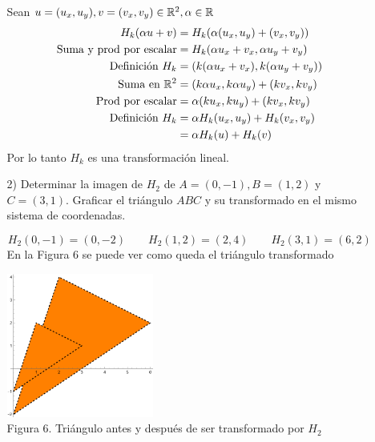 \begin{enumerate}
\begin{enumerate}
\begin{mdframed}[style=s]
                        Sean $u=(u_x,u_y),v=(v_x,v_y)\in\mathbb{R}^2,\alpha\in\mathbb{R}$
                        \begin{align*}
                            H_k(\alpha u+v)&=H_k(\alpha(u_x,u_y)+(v_x,v_y))\\
                            \text{Suma y prod por escalar}&=H_k(\alpha u_x+v_x,\alpha u_y+v_y)\\
                            \text{Definición }H_k&=(k(\alpha u_x+v_x),k(\alpha u_y+v_y))\\
                            \text{Suma en }\mathbb{R}^2&=(k\alpha u_x,k\alpha u_y)+(kv_x,kv_y)\\
                            \text{Prod por escalar}&=\alpha(ku_x,ku_y)+(kv_x,kv_y)\\
                            \text{Definición }H_k&=\alpha H_k(u_x,u_y)+H_k(v_x,v_y)\\
                            &=\alpha H_k(u)+H_k(v)
                        \end{align*}
                        Por lo tanto $H_k$ es una transformación lineal.
                    \end{mdframed}
                \item[2)] Determinar la imagen de $H_2$ de $A=(0,-1),B=(1,2)$ y $C=(3,1)$. Graficar el triángulo $ABC$ y su transformado en el mismo sistema de coordenadas.
                    \begin{mdframed}[style=s]
                        \[H_2(0,-1)=(0,-2)\qquad H_2(1,2)=(2,4)\qquad H_2(3,1)=(6,2)\]
                        En la Figura 6 se puede ver como queda el triángulo transformado
                        \begin{center}
                            \includegraphics[width=0.4\textwidth]{img/ej11c.png}\\
                            Figura 6. Triángulo antes y después de ser transformado por $H_2$
                        \end{center}
                    \end{mdframed}

\end{enumerate}
\end{enumerate}

